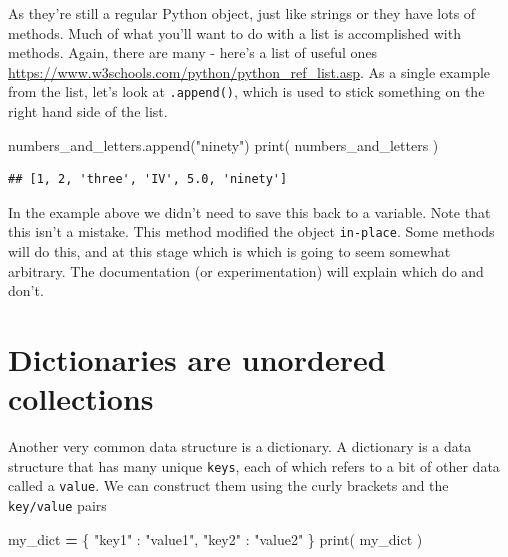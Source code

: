 \documentclass[]{book}
\newenvironment{Shaded}{\begin{snugshade}}{\end{snugshade}}
\newcommand{\BuiltInTok}[1]{#1}
\newcommand{\NormalTok}[1]{#1}
\newcommand{\OperatorTok}[1]{\textcolor[rgb]{0.81,0.36,0.00}{\textbf{#1}}}
\newcommand{\StringTok}[1]{\textcolor[rgb]{0.31,0.60,0.02}{#1}}
\theoremstyle{definition}
\theoremstyle{definition}
\theoremstyle{definition}
\theoremstyle{remark}
\let\BeginKnitrBlock\begin \let\EndKnitrBlock\end
\begin{document}
As they're still a regular Python object, just like strings or they have
lots of methods. Much of what you'll want to do with a list is
accomplished with methods. Again, there are many - here's a list of
useful ones \url{https://www.w3schools.com/python/python_ref_list.asp}.
As a single example from the list, let's look at \texttt{.append()},
which is used to stick something on the right hand side of the list.

\begin{Shaded}
\begin{Highlighting}[]
\NormalTok{numbers_and_letters.append(}\StringTok{"ninety"}\NormalTok{)}
\BuiltInTok{print}\NormalTok{( numbers_and_letters )}
\end{Highlighting}
\end{Shaded}

\begin{verbatim}
## [1, 2, 'three', 'IV', 5.0, 'ninety']
\end{verbatim}

\BeginKnitrBlock{reader}
In the example above we didn't need to save this back to a variable.
Note that this isn't a mistake. This method modified the object
\texttt{in-place}. Some methods will do this, and at this stage which is
which is going to seem somewhat arbitrary. The documentation (or
experimentation) will explain which do and don't.
\EndKnitrBlock{reader}

\hypertarget{dictionaries-are-unordered-collections}{%
\section{Dictionaries are unordered
collections}\label{dictionaries-are-unordered-collections}}

Another very common data structure is a dictionary. A dictionary is a
data structure that has many unique \texttt{keys}, each of which refers
to a bit of other data called a \texttt{value}. We can construct them
using the curly brackets and the \texttt{key/value} pairs

\begin{Shaded}
\begin{Highlighting}[]
\NormalTok{my_dict }\OperatorTok{=}\NormalTok{ \{}
  \StringTok{"key1"}\NormalTok{ : }\StringTok{"value1"}\NormalTok{,}
  \StringTok{"key2"}\NormalTok{ : }\StringTok{"value2"}
\NormalTok{\}}
\BuiltInTok{print}\NormalTok{( my_dict )}
\end{Highlighting}
\end{Shaded}
\end{document}
